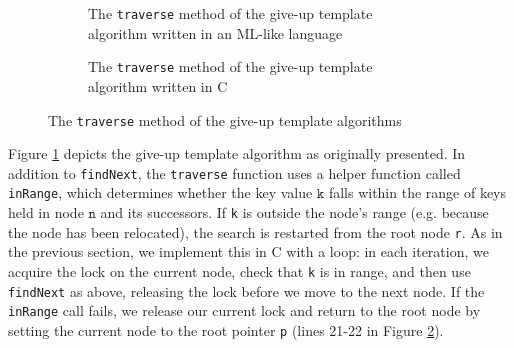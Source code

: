 \documentclass[a4paper,UKenglish,cleveref, autoref, thm-restate]{lipics-v2021}
\begin{document}
\begin{figure}[!ht]
	\begin{subfigure}[t]{0.45\textwidth}
		 
		\caption{The \lstinline{traverse} method of the give-up template algorithm written in an ML-like language}
		\label{traverse_giveup_a}	
	\end{subfigure}\qquad
	\begin{subfigure}[t]{0.48\textwidth}
		 
		\caption{The \lstinline{traverse} method of the give-up template algorithm written in C}
		\label{traverse_giveup_b}
	\end{subfigure}
	\caption{The \lstinline{traverse} method of the give-up template algorithms}
	\label{traverse_giveup}
\end{figure}

Figure \ref{traverse_giveup_a} depicts the give-up template algorithm as originally presented. In addition to \lstinline{findNext}, the \lstinline{traverse} function uses a helper function called \lstinline{inRange}, which determines whether the key value $\texttt{k}$ falls within the range of keys held in node $\texttt{n}$ and its successors. If \lstinline{k} is outside the node's range (e.g. because the node has been relocated), the search is restarted from the root node \lstinline{r}. As in the previous section, we implement this in C with a loop: in each iteration, we acquire the lock on the current node, check that \lstinline{k} is in range, and then use \lstinline{findNext} as above, releasing the lock before we move to the next node. If the \lstinline{inRange} call fails, we release our current lock and return to the root node by setting the current node to the root pointer \lstinline{p} (lines 21-22 in Figure \ref{traverse_giveup_b}).
\end{document}
